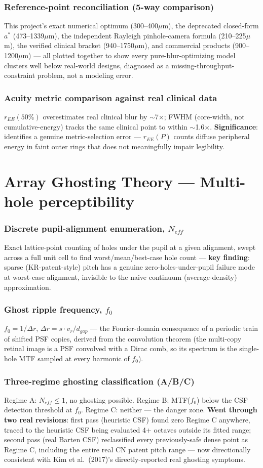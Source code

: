 \documentclass[10pt]{report}
\newcommand{\feat}[1]{\subsection*{#1}}
\begin{document}
\feat{Reference-point reconciliation (5-way comparison)}
This project's exact numerical optimum (300--400$\mu$m), the deprecated closed-form $a^*$ (473--1339$\mu$m), the independent Rayleigh pinhole-camera formula (210--225$\mu$m), the verified clinical bracket (940--1750$\mu$m), and commercial products (900--1200$\mu$m) --- all plotted together to show every pure-blur-optimizing model clusters well below real-world designs, diagnosed as a missing-throughput-constraint problem, not a modeling error.

\feat{Acuity metric comparison against real clinical data}
$r_{EE}(50\%)$ overestimates real clinical blur by $\sim$7$\times$; FWHM (core-width, not cumulative-energy) tracks the same clinical point to within $\sim$1.6$\times$. \textbf{Significance}: identifies a genuine metric-selection error --- $r_{EE}(P)$ counts diffuse peripheral energy in faint outer rings that does not meaningfully impair legibility.

\chapter{Array Ghosting Theory --- Multi-hole perceptibility}
\label{ch:ghost}
\feat{Discrete pupil-alignment enumeration, $N_{eff}$}
Exact lattice-point counting of holes under the pupil at a given alignment, swept across a full unit cell to find worst/mean/best-case hole count --- \textbf{key finding}: sparse (KR-patent-style) pitch has a genuine zero-holes-under-pupil failure mode at worst-case alignment, invisible to the naive continuum (average-density) approximation.

\feat{Ghost ripple frequency, $f_0$}
$f_0=1/\Delta r$, $\Delta r=s\cdot v_r/d_{gap}$ --- the Fourier-domain consequence of a periodic train of shifted PSF copies, derived from the convolution theorem (the multi-copy retinal image is a PSF convolved with a Dirac comb, so its spectrum is the single-hole MTF sampled at every harmonic of $f_0$).

\feat{Three-regime ghosting classification (A/B/C)}
Regime A: $N_{eff}\le1$, no ghosting possible. Regime B: MTF($f_0$) below the CSF detection threshold at $f_0$. Regime C: neither --- the danger zone. \textbf{Went through two real revisions}: first pass (heuristic CSF) found zero Regime C anywhere, traced to the heuristic CSF being evaluated 4+ octaves outside its fitted range; second pass (real Barten CSF) reclassified every previously-safe dense point as Regime C, including the entire real CN patent pitch range --- now directionally consistent with Kim et al.\ (2017)'s directly-reported real ghosting symptoms.
\end{document}
